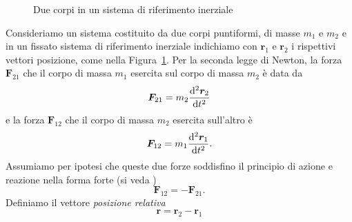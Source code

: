 \begin{figure}
  \centering
  \caption{Due corpi in un sistema di riferimento inerziale}
  \label{fig:due-corpi}
\end{figure}
Consideriamo un sistema costituito da due corpi puntiformi, di masse $m_1$ e
$m_2$ e in un fissato sistema di riferimento inerziale indichiamo con $\bm{r}_1$
e $\bm{r}_2$ i rispettivi vettori posizione, come nella
Figura~\ref{fig:due-corpi}. Per la seconda legge di Newton, la forza
$\bm{F}_{21}$ che il corpo di massa $m_1$ esercita sul corpo di massa $m_2$ è
data da
\begin{equation}
  \label{eq:f21}
  \bm{F}_{21} = m_2\toder[2]{\bm{r}_2}{t}
\end{equation}
e la forza $\bm{F}_{12}$ che il corpo di massa $m_2$ esercita sull'altro è
\begin{equation}
  \label{eq:f12}
  \bm{F}_{12} = m_1\toder[2]{\bm{r}_1}{t}.
\end{equation}
Assumiamo per ipotesi che queste due forze soddisfino il principio di azione e
reazione nella forma forte (si veda \textcite{goldstein:meccanica})
\begin{equation}
  \label{eq:azione-reazione}
  \bm{F}_{12} = -\bm{F}_{21}.
\end{equation}
Definiamo il vettore \emph{posizione relativa}
\begin{equation}
  \label{eq:posizione-relativa}
  \bm{r}=\bm{r}_2-\bm{r}_1
\end{equation}
